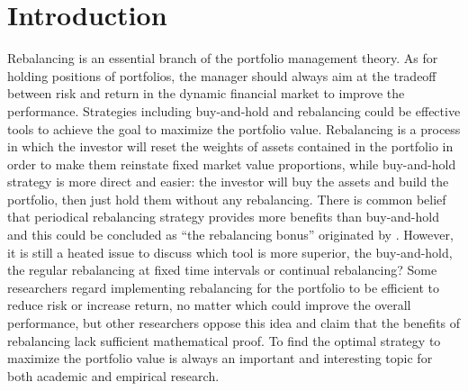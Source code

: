 \documentclass[
10pt, %
a4paper, %
oneside, %
headinclude,footinclude, %
BCOR5mm, %
]{scrartcl}
\begin{document}
\section{Introduction}
Rebalancing is an essential branch of the portfolio management theory. As for holding positions of portfolios, the manager should always aim at the tradeoff between risk and return in the dynamic financial market to improve the performance. Strategies including buy-and-hold and rebalancing could be effective tools to achieve the goal to maximize the portfolio value. Rebalancing is a process in which the investor will reset the weights of assets contained in the portfolio in order to make them reinstate fixed market value
proportions, while buy-and-hold strategy is more direct and easier: the investor will buy the assets and build the portfolio, then just hold them without any rebalancing. There is common belief that periodical rebalancing strategy provides more benefits than buy-and-hold and this could be concluded as “the rebalancing bonus” originated by \cite{bernstein1996rebalancing}. However, it is still a heated issue to discuss which tool is more superior, the buy-and-hold, the regular rebalancing at fixed time intervals or continual rebalancing? Some researchers regard implementing rebalancing for the portfolio to be efficient to reduce risk or increase return, no matter which could improve the overall performance, but other researchers oppose this idea and claim that the benefits of rebalancing lack sufficient mathematical proof. To find the optimal strategy to maximize the portfolio value is always an important and interesting topic for both academic and empirical research.\\
\end{document}
